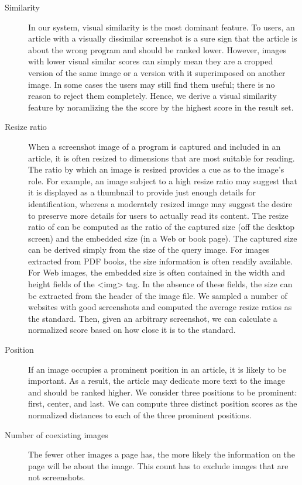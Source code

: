 \documentclass{www2010-submission}
\begin{document}
\begin{description}

\item[Similarity] In our system, visual similarity is the most
  dominant feature. To users, an article with a visually dissimilar
  screenshot is a sure sign that the article is about the wrong
  program and should be ranked lower. However, images with lower
  visual similar scores can simply mean they are a cropped version of
  the same image or a version with it superimposed on another
  image. In some cases the users may still find them useful; there is
  no reason to reject them completely. Hence, we derive a visual
  similarity feature by noramlizing the the score by the highest score
  in the result set.

\item[Resize ratio] When a screenshot image of a program is captured
  and included in an article, it is often resized to dimensions that
  are most suitable for reading. The ratio by which an image is
  resized provides a cue as to the image's role. For example, an image
  subject to a high resize ratio may suggest that it is displayed as a
  thumbnail to provide just enough details for identification, whereas
  a moderately resized image may suggest the desire to preserve more
  details for users to actually read its content. The resize ratio of
  can be computed as the ratio of the captured size (off the desktop
  screen) and the embedded size (in a Web or book page). The captured
  size can be derived simply from the size of the query image. For
  images extracted from PDF books, the size information is often
  readily available. For Web images, the embedded size is often
  contained in the width and height fields of the <img> tag. In the
  absence of these fields, the size can be extracted from the header
  of the image file. We sampled a number of websites with good
  screenshots and computed the average resize ratios as the standard.
  Then, given an arbitrary screenshot, we can calculate a normalized
  score based on how close it is to the standard.

\item[Position] If an image occupies a prominent position in an
  article, it is likely to be important. As a result, the article may
  dedicate more text to the image and should be ranked higher.  We
  consider three positions to be prominent: first, center, and
  last. We can compute three distinct position scores as the
  normalized distances to each of the three prominent positions.

\item[Number of coexisting images] The fewer other images a page has,
  the more likely the information on the page will be about the
  image. This count has to exclude images that are not screenshots.

\end{description}
\end{document}
